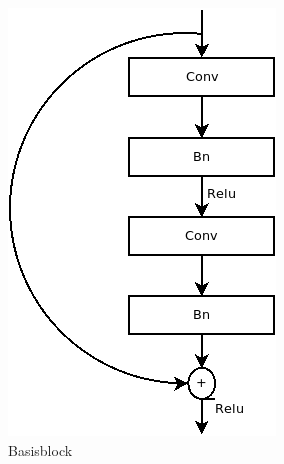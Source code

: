 \begin{figure}[]
   \begin{minipage}[b]{.4\linewidth} %
      \includegraphics[width=0.8\linewidth]{KapitelPartB/Images/Basisblock.png}
      \caption{Basisblock}
   \end{minipage}
   \hspace{.1\linewidth}%
   \begin{minipage}[b]{.4\linewidth} %

\end{minipage}
\end{figure}
